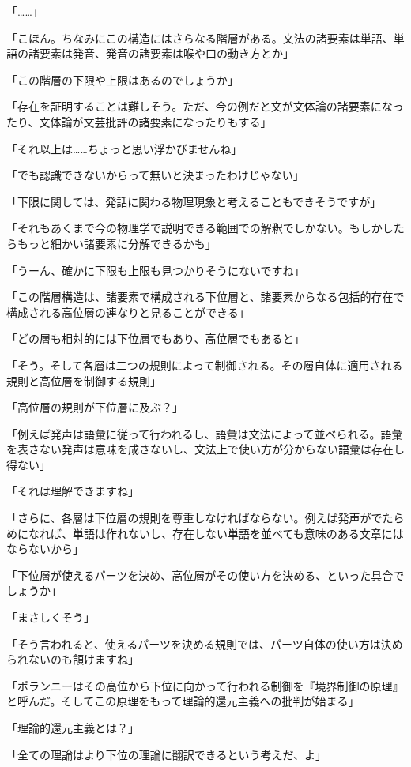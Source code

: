 \documentclass[paper=b5j]{jlreq}
\begin{document}
「……」

「こほん。ちなみにこの構造にはさらなる階層がある。文法の諸要素は単語、単語の諸要素は発音、発音の諸要素は喉や口の動き方とか」

「この階層の下限や上限はあるのでしょうか」

「存在を証明することは難しそう。ただ、今の例だと文が文体論の諸要素になったり、文体論が文芸批評の諸要素になったりもする」

「それ以上は……ちょっと思い浮かびませんね」

「でも認識できないからって無いと決まったわけじゃない」

「下限に関しては、発話に関わる物理現象と考えることもできそうですが」

「それもあくまで今の物理学で説明できる範囲での解釈でしかない。もしかしたらもっと細かい諸要素に分解できるかも」

「うーん、確かに下限も上限も見つかりそうにないですね」

「この階層構造は、諸要素で構成される下位層と、諸要素からなる包括的存在で構成される高位層の連なりと見ることができる」

「どの層も相対的には下位層でもあり、高位層でもあると」

「そう。そして各層は二つの規則によって制御される。その層自体に適用される規則と高位層を制御する規則\cite[67]{polanyi1966ja}」

「高位層の規則が下位層に及ぶ？」

「例えば発声は語彙に従って行われるし、語彙は文法によって並べられる。語彙を表さない発声は意味を成さないし、文法上で使い方が分からない語彙は存在し得ない」

「それは理解できますね」

「さらに、各層は下位層の規則を尊重しなければならない。例えば発声がでたらめになれば、単語は作れないし、存在しない単語を並べても意味のある文章にはならないから」

「下位層が使えるパーツを決め、高位層がその使い方を決める、といった具合でしょうか」

「まさしくそう」

「そう言われると、使えるパーツを決める規則では、パーツ自体の使い方は決められないのも頷けますね」

「ポランニーはその高位から下位に向かって行われる制御を『境界制御の原理』\cite[73]{polanyi1966ja}と呼んだ。そしてこの原理をもって理論的還元主義への批判が始まる」

「理論的還元主義とは？」

「全ての理論はより下位の理論に翻訳できるという考えだ、よ」
\end{document}
